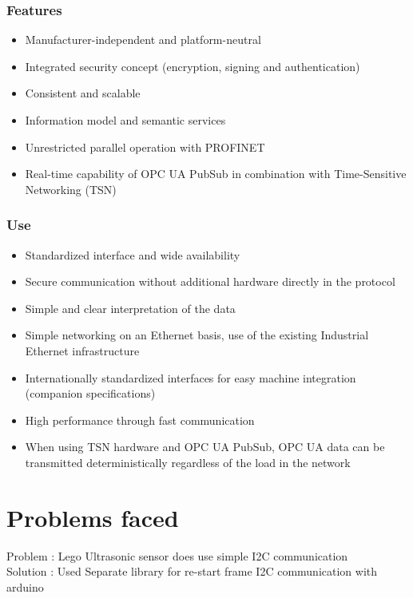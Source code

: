 \documentclass{article}
\begin{document}
	\subsubsection{Features}
	\begin{itemize}
	\item Manufacturer-independent and platform-neutral
	\item Integrated security concept (encryption, signing and authentication)
	\item Consistent and scalable
	\item Information model and semantic services
	\item Unrestricted parallel operation with PROFINET
	\item Real-time capability of OPC UA PubSub in combination with Time-Sensitive Networking (TSN)
	\end{itemize}
	
	\subsubsection{Use}
	\begin{itemize}
	\item Standardized interface and wide availability
\item Secure communication without additional hardware directly in the protocol
\item Simple and clear interpretation of the data
\item Simple networking on an Ethernet basis, use of the existing Industrial Ethernet infrastructure
\item Internationally standardized interfaces for easy machine integration (companion specifications)
\item High performance through fast communication
\item When using TSN hardware and OPC UA PubSub, OPC UA data can be transmitted deterministically regardless of the load in the network
	\end{itemize}
	  	
  	 
  \pagebreak
  \section{Problems faced}
  Problem : Lego Ultrasonic sensor does use simple I2C communication\\
  Solution : Used Separate library for re-start frame I2C communication with arduino\\
  
\end{document}

